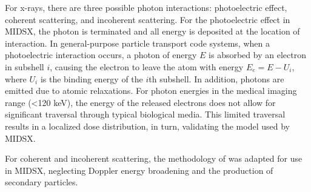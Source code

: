 \par For x-rays, there are three possible photon interactions: photoelectric effect, coherent scattering, and incoherent scattering. For the photoelectric effect in MIDSX, the photon is terminated and all energy is deposited at the location of interaction. In general-purpose particle transport code systems, when a photoelectric interaction occurs, a photon of energy $E$ is absorbed by an electron in subshell $i$, causing the electron to leave the atom with energy $E_e = E - U_i$, where $U_i$ is the binding energy of the $i$th subshell. In addition, photons are emitted due to atomic relaxations. For photon energies in the medical imaging range (<120 keV), the energy of the released electrons does not allow for significant traversal through typical biological media. This limited traversal results in a localized dose distribution, in turn, validating the model used by MIDSX.

\par For coherent and incoherent scattering, the methodology of  was adapted for use in MIDSX, neglecting Doppler energy broadening and the production of secondary particles.




